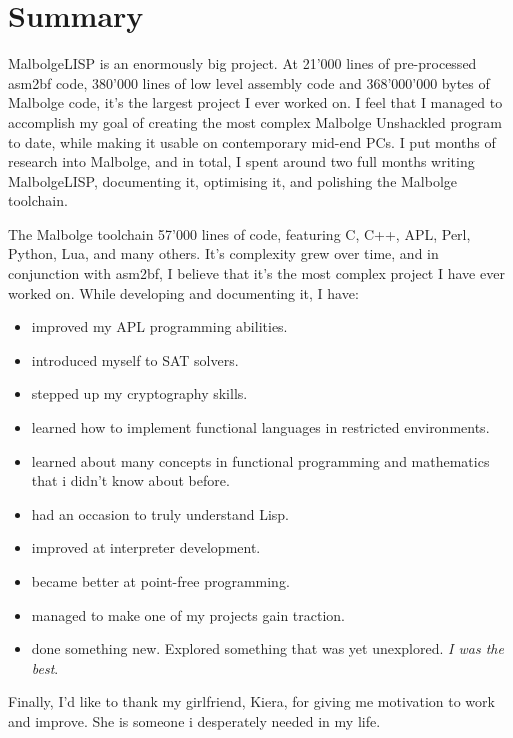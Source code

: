 
\chapter{Summary}

\par MalbolgeLISP is an enormously big project. At 21'000 lines of pre-processed asm2bf code, 380'000 lines of low level assembly code and 368'000'000 bytes of Malbolge code, it's the largest project I ever worked on. I feel that I managed to accomplish my goal of creating the most complex Malbolge Unshackled program to date, while making it usable on contemporary mid-end PCs. I put months of research into Malbolge, and in total, I spent around two full months writing MalbolgeLISP, documenting it, optimising it, and polishing the Malbolge toolchain.

\par The Malbolge toolchain 57'000 lines of code, featuring C, C++, APL, Perl, Python, Lua, and many others. It's complexity grew over time, and in conjunction with asm2bf, I believe that it's the most complex project I have ever worked on. While developing and documenting it, I have:
\begin{itemize}
    \item improved my APL programming abilities.
    \item introduced myself to SAT solvers.
    \item stepped up my cryptography skills.
    \item learned how to implement functional languages in restricted environments.
    \item learned about many concepts in functional programming and mathematics that i didn't know about before.
    \item had an occasion to truly understand Lisp.
    \item improved at interpreter development.
    \item became better at point-free programming.
    \item managed to make one of my projects gain traction.
    \item done something new. Explored something that was yet unexplored. \textit{I was the best}.
\end{itemize}

\par Finally, I'd like to thank my girlfriend, Kiera, for giving me motivation to work and improve. She is someone i desperately needed in my life.
